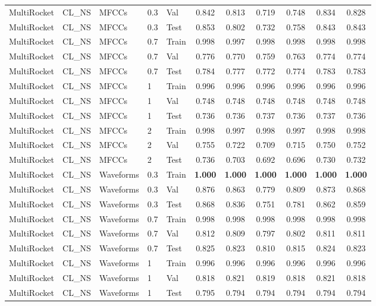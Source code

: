 \begin{landscape}
\begin{longtable}{|l|l|l|l|l|c|c|c|c|c|c|}
MultiRocket & CL\_NS & MFCCs & 0.3 & Val & 0.842 & 0.813 & 0.719 & 0.748 & 0.834 & 0.828 \\
MultiRocket & CL\_NS & MFCCs & 0.3 & Test & 0.853 & 0.802 & 0.732 & 0.758 & 0.843 & 0.843 \\
MultiRocket & CL\_NS & MFCCs & 0.7 & Train & 0.998 & 0.997 & 0.998 & 0.998 & 0.998 & 0.998 \\
MultiRocket & CL\_NS & MFCCs & 0.7 & Val & 0.776 & 0.770 & 0.759 & 0.763 & 0.774 & 0.774 \\
MultiRocket & CL\_NS & MFCCs & 0.7 & Test & 0.784 & 0.777 & 0.772 & 0.774 & 0.783 & 0.783 \\
MultiRocket & CL\_NS & MFCCs & 1 & Train & 0.996 & 0.996 & 0.996 & 0.996 & 0.996 & 0.996 \\
MultiRocket & CL\_NS & MFCCs & 1 & Val & 0.748 & 0.748 & 0.748 & 0.748 & 0.748 & 0.748 \\
MultiRocket & CL\_NS & MFCCs & 1 & Test & 0.736 & 0.736 & 0.737 & 0.736 & 0.737 & 0.736 \\
MultiRocket & CL\_NS & MFCCs & 2 & Train & 0.998 & 0.997 & 0.998 & 0.997 & 0.998 & 0.998 \\
MultiRocket & CL\_NS & MFCCs & 2 & Val & 0.755 & 0.722 & 0.709 & 0.715 & 0.750 & 0.752 \\
MultiRocket & CL\_NS & MFCCs & 2 & Test & 0.736 & 0.703 & 0.692 & 0.696 & 0.730 & 0.732 \\
MultiRocket & CL\_NS & Waveforms & 0.3 & Train & \textbf{1.000} & \textbf{1.000} & \textbf{1.000} & \textbf{1.000} & \textbf{1.000} & \textbf{1.000} \\
MultiRocket & CL\_NS & Waveforms & 0.3 & Val & 0.876 & 0.863 & 0.779 & 0.809 & 0.873 & 0.868 \\
MultiRocket & CL\_NS & Waveforms & 0.3 & Test & 0.868 & 0.836 & 0.751 & 0.781 & 0.862 & 0.859 \\
MultiRocket & CL\_NS & Waveforms & 0.7 & Train & 0.998 & 0.998 & 0.998 & 0.998 & 0.998 & 0.998 \\
MultiRocket & CL\_NS & Waveforms & 0.7 & Val & 0.812 & 0.809 & 0.797 & 0.802 & 0.811 & 0.811 \\
MultiRocket & CL\_NS & Waveforms & 0.7 & Test & 0.825 & 0.823 & 0.810 & 0.815 & 0.824 & 0.823 \\
MultiRocket & CL\_NS & Waveforms & 1 & Train & 0.996 & 0.996 & 0.996 & 0.996 & 0.996 & 0.996 \\
MultiRocket & CL\_NS & Waveforms & 1 & Val & 0.818 & 0.821 & 0.819 & 0.818 & 0.821 & 0.818 \\
MultiRocket & CL\_NS & Waveforms & 1 & Test & 0.795 & 0.794 & 0.794 & 0.794 & 0.794 & 0.794 \\

\end{longtable}
\end{landscape}
